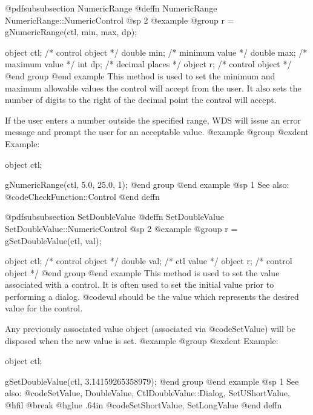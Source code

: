 @pdfsubsubsection {NumericRange}
@deffn {NumericRange} NumericRange::NumericControl
@sp 2
@example
@group
r = gNumericRange(ctl, min, max, dp);

object  ctl;   /*  control object  */
double  min;   /*  minimum value   */
double  max;   /*  maximum value   */
int     dp;    /*  decimal places  */
object  r;     /*  control object  */
@end group
@end example
This method is used to set the minimum and maximum allowable values
the control will accept from the user.  It also sets the number of
digits to the right of the decimal point the control will accept.

If the user enters a number outside the specified range, WDS will
issue an error message and prompt the user for an acceptable value.
@example
@group
@exdent Example:

object  ctl;

gNumericRange(ctl, 5.0, 25.0, 1);
@end group
@end example
@sp 1
See also:  @code{CheckFunction::Control}
@end deffn














@pdfsubsubsection {SetDoubleValue}
@deffn {SetDoubleValue} SetDoubleValue::NumericControl
@sp 2
@example
@group
r = gSetDoubleValue(ctl, val);

object  ctl;    /*  control object  */
double  val;    /*  ctl value       */
object  r;      /*  control object  */
@end group
@end example
This method is used to set the value associated with a control.  It is
often used to set the initial value prior to performing a dialog.
@code{val} should be the value which represents the desired value for
the control.

Any previously associated value object (associated via @code{SetValue})
will be disposed when the new value is set.
@example
@group
@exdent Example:

object  ctl;

gSetDoubleValue(ctl, 3.14159265358979);
@end group
@end example
@sp 1
See also:  @code{SetValue, DoubleValue, CtlDoubleValue::Dialog, SetUShortValue,}
@hfil @break @hglue .64in   @code{SetShortValue, SetLongValue}
@end deffn















